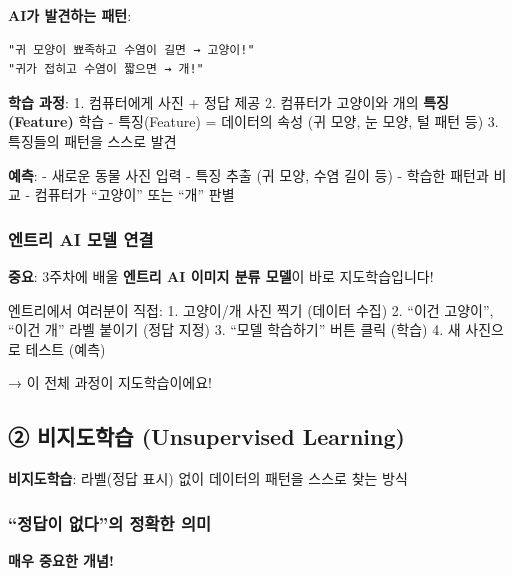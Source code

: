 \documentclass[a4paper, 11pt]{article}
\renewenvironment{quote}
  {\begin{tcolorbox}[colback=lightblue!30, colframe=mainblue!50,
   left=8pt, right=8pt, top=4pt, bottom=4pt, breakable]}
  {\end{tcolorbox}}
\begin{document}
 \textbf{AI가 발견하는 패턴}:

\begin{verbatim}
"귀 모양이 뾰족하고 수염이 길면 → 고양이!"
"귀가 접히고 수염이 짧으면 → 개!"
\end{verbatim}

\textbf{학습 과정}: 1. 컴퓨터에게 사진 + 정답 제공 2. 컴퓨터가 고양이와
개의 \textbf{특징(Feature)} 학습 - 특징(Feature) = 데이터의 속성 (귀
모양, 눈 모양, 털 패턴 등) 3. 특징들의 패턴을 스스로 발견

\textbf{예측}: - 새로운 동물 사진 입력 - 특징 추출 (귀 모양, 수염 길이
등) - 학습한 패턴과 비교 - 컴퓨터가 ``고양이'' 또는 ``개'' 판별

\hypertarget{uxc5d4uxd2b8uxb9ac-ai-uxbaa8uxb378-uxc5f0uxacb0}{%
\subsubsection{엔트리 AI 모델
연결}\label{uxc5d4uxd2b8uxb9ac-ai-uxbaa8uxb378-uxc5f0uxacb0}}

 \textbf{중요}: 3주차에 배울 \textbf{엔트리 AI 이미지 분류 모델}이
바로 지도학습입니다!

엔트리에서 여러분이 직접: 1. 고양이/개 사진 찍기 (데이터 수집) 2. ``이건
고양이'', ``이건 개'' 라벨 붙이기 (정답 지정) 3. ``모델 학습하기'' 버튼
클릭 (학습) 4. 새 사진으로 테스트 (예측)

→ 이 전체 과정이 지도학습이에요!

\hypertarget{uxbe44uxc9c0uxb3c4uxd559uxc2b5-unsupervised-learning}{%
\subsection{\textbf{②} 비지도학습 (Unsupervised
Learning)}\label{uxbe44uxc9c0uxb3c4uxd559uxc2b5-unsupervised-learning}}

\begin{quote}
\textbf{비지도학습}: 라벨(정답 표시) 없이 데이터의 패턴을 스스로 찾는
방식
\end{quote}

\hypertarget{uxc815uxb2f5uxc774-uxc5c6uxb2e4uxc758-uxc815uxd655uxd55c-uxc758uxbbf8}{%
\subsubsection{``정답이 없다''의 정확한
의미}\label{uxc815uxb2f5uxc774-uxc5c6uxb2e4uxc758-uxc815uxd655uxd55c-uxc758uxbbf8}}

 \textbf{매우 중요한 개념!}
\end{document}
